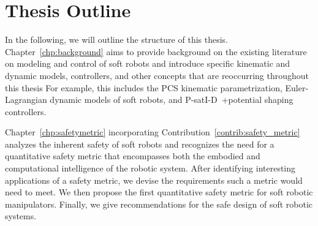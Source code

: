 \section{Thesis Outline}\label{sec:introduction:outline}
In the following, we will outline the structure of this thesis.
Chapter~\ref{chp:background} aims to provide background on the existing literature on modeling and control of soft robots and introduce specific kinematic and dynamic models, controllers, and other concepts that are reoccurring throughout this thesis
For example, this includes the \gls{PCS} kinematic parametrization, Euler-Lagrangian dynamic models of soft robots, and P-satI-D~\citep{pustina2022p}+potential shaping~\citep{della2023model} controllers.

Chapter~\ref{chp:safetymetric} incorporating Contribution~\ref{contrib:safety_metric} analyzes the inherent safety of soft robots and recognizes the need for a quantitative safety metric that encompasses both the embodied and computational intelligence of the robotic system. After identifying interesting applications of a safety metric, we devise the requirements such a metric would need to meet. We then propose the first quantitative safety metric for soft robotic manipulators. Finally, we give recommendations for the safe design of soft robotic systems.

